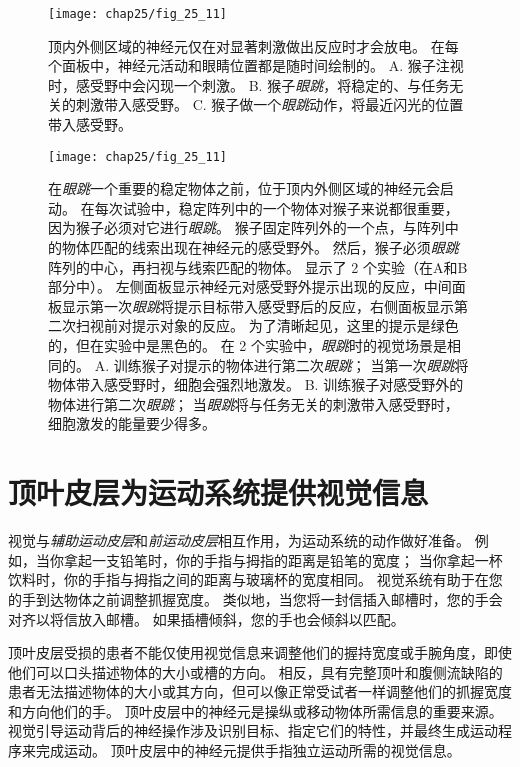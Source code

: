 \begin{figure}[htbp]
	\centering
	\texttt{[image: chap25/fig\_25\_11]}
	\caption{顶内外侧区域的神经元仅在对显著刺激做出反应时才会放电。
		在每个面板中，神经元活动和眼睛位置都是随时间绘制的。
		A. 猴子注视时，感受野中会闪现一个刺激。
		B. 猴子\textit{眼跳}，将稳定的、与任务无关的刺激带入感受野。
		C. 猴子做一个\textit{眼跳}动作，将最近闪光的位置带入感受野。}
	\label{fig:25_11}
\end{figure}


\begin{figure}[htbp]
	\centering
	\texttt{[image: chap25/fig\_25\_11]}
	\caption{在\textit{眼跳}一个重要的稳定物体之前，位于顶内外侧区域的神经元会启动。
		在每次试验中，稳定阵列中的一个物体对猴子来说都很重要，因为猴子必须对它进行\textit{眼跳}。
		猴子固定阵列外的一个点，与阵列中的物体匹配的线索出现在神经元的感受野外。
		然后，猴子必须\textit{眼跳}阵列的中心，再扫视与线索匹配的物体。
		显示了 2 个实验（在A和B部分中）。
		左侧面板显示神经元对感受野外提示出现的反应，中间面板显示第一次\textit{眼跳}将提示目标带入感受野后的反应，右侧面板显示第二次扫视前对提示对象的反应。
		为了清晰起见，这里的提示是绿色的，但在实验中是黑色的。
		在 2 个实验中，\textit{眼跳}时的视觉场景是相同的。
		A. 训练猴子对提示的物体进行第二次\textit{眼跳}；
		当第一次\textit{眼跳}将物体带入感受野时，细胞会强烈地激发。
		B. 训练猴子对感受野外的物体进行第二次\textit{眼跳}；
		当\textit{眼跳}将与任务无关的刺激带入感受野时，细胞激发的能量要少得多。}
	\label{fig:25_12}
\end{figure}



\section{顶叶皮层为运动系统提供视觉信息}

视觉与\textit{辅助运动皮层}和\textit{前运动皮层}相互作用，为运动系统的动作做好准备。
例如，当你拿起一支铅笔时，你的手指与拇指的距离是铅笔的宽度；
当你拿起一杯饮料时，你的手指与拇指之间的距离与玻璃杯的宽度相同。
视觉系统有助于在您的手到达物体之前调整抓握宽度。
类似地，当您将一封信插入邮槽时，您的手会对齐以将信放入邮槽。
如果插槽倾斜，您的手也会倾斜以匹配。


顶叶皮层受损的患者不能仅使用视觉信息来调整他们的握持宽度或手腕角度，即使他们可以口头描述物体的大小或槽的方向。
相反，具有完整顶叶和腹侧流缺陷的患者无法描述物体的大小或其方向，但可以像正常受试者一样调整他们的抓握宽度和方向他们的手。
顶叶皮层中的神经元是操纵或移动物体所需信息的重要来源。
视觉引导运动背后的神经操作涉及识别目标、指定它们的特性，并最终生成运动程序来完成运动。
顶叶皮层中的神经元提供手指独立运动所需的视觉信息。


